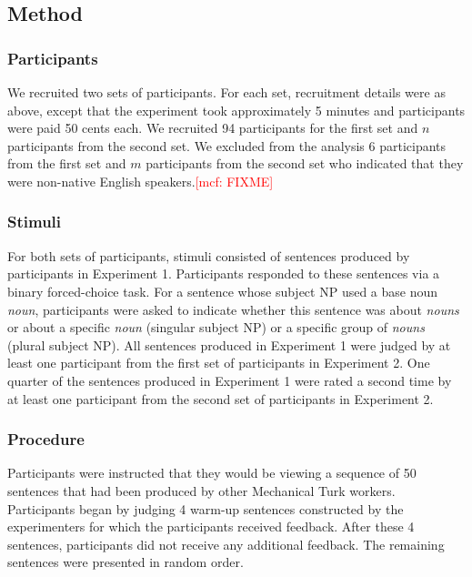 \documentclass[10pt,letterpaper]{article}
\newcommand{\mcf}[1]{\textcolor{Red}{[mcf: #1]}}
\begin{document}
\subsection{Method}

\subsubsection{Participants}

We recruited two sets of participants. For each set, recruitment details were as above, except that the experiment took approximately 5 minutes and participants were paid 50 cents each. We recruited 94 participants for the first set and \(n\) participants from the second set. We excluded from the analysis 6 participants from the first set and \(m\) participants from the second set who indicated that they were non-native English speakers.\mcf{FIXME}

\subsubsection{Stimuli}

For both sets of participants, stimuli consisted of sentences produced by participants in Experiment 1. Participants responded to these sentences via a binary forced-choice task. For a sentence whose subject NP used a base noun \textit{noun}, participants were asked to indicate whether this sentence was about \textit{nouns} or about a specific \textit{noun} (singular subject NP) or a specific group of \textit{nouns} (plural subject NP). All sentences produced in Experiment 1 were judged by at least one participant from the first set of participants in Experiment 2. One quarter of the sentences produced in Experiment 1 were rated a second time by at least one participant from the second set of participants in Experiment 2.

\subsubsection{Procedure}

Participants were instructed that they would be viewing a sequence of 50 sentences that had been produced by other Mechanical Turk workers. Participants began by judging 4 warm-up sentences constructed by the experimenters for which the participants received feedback. After these 4 sentences, participants did not receive any additional feedback. The remaining sentences were presented in random order.
\end{document}

